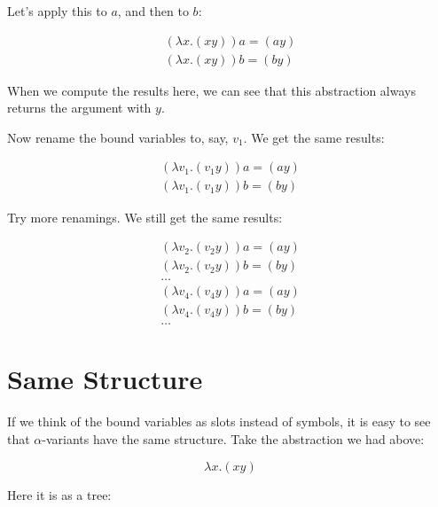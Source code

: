\documentclass{book}
\numberwithin{equation}{chapter}
\begin{document}
\noindent
Let's apply this to $a$, and then to $b$:

\begin{align}
(\lambda x.(x y)) a = (a y) \\
(\lambda x.(x y)) b = (b y)
\end{align}

\noindent
When we compute the results here, we can see that this abstraction always returns the argument with $y$.

Now rename the bound variables to, say, $v_{1}$. We get the same results:

\begin{align}
(\lambda v_{1}.(v_{1} y)) a = (a y) \\
(\lambda v_{1}.(v_{1} y)) b = (b y)
\end{align}

\noindent
Try more renamings. We still get the same results:

\begin{align}
(\lambda v_{2}.(v_{2} y)) a = (a y) \\
(\lambda v_{2}.(v_{2} y)) b = (b y) \\
\ldots \\
(\lambda v_{4}.(v_{4} y)) a = (a y) \\
(\lambda v_{4}.(v_{4} y)) b = (b y) \\
\ldots
\end{align}


\section{Same Structure}

If we think of the bound variables as slots instead of symbols, it is easy to see that $\alpha$-variants have the same structure. Take the abstraction we had above:

\begin{equation}
\lambda x.(x y)
\end{equation}

\noindent
Here it is as a tree:

\begin{center}
\end{center}
\end{document}
